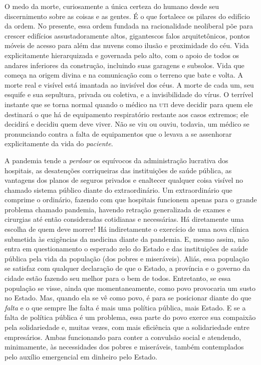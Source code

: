 O medo da morte, curiosamente a única certeza do humano desde seu
discernimento sobre as coisas e as gentes. É o que fortalece os pilares
do edifício da ordem. No presente, essa ordem fundada na racionalidade
neoliberal põe para crescer edifícios assustadoramente altos,
gigantescos falos arquitetônicos, pontos móveis de acesso para além das
nuvens como ilusão e proximidade do céu. Vida explicitamente
hierarquizada e governada pelo alto, com o apoio de todos os andares
inferiores da construção, incluindo suas garagens e subsolos. Vida que
começa na origem divina e na comunicação com o terreno que bate e volta.
A morte real e visível está imantada ao invisível dos céus. A morte de
cada um, seu esquife e sua sepultura, privada ou coletiva, e a
invisibilidade do vírus. O terrível instante que se torna normal quando
o médico na \textsc{uti} deve decidir para quem ele destinará o que há de
equipamento respiratório restante aos casos extremos; ele decidirá e
decidiu quem deve viver. Não se viu ou ouviu, todavia, um médico se
pronunciando contra a falta de equipamentos que o levava a se assenhorar
explicitamente da vida do \emph{paciente}.

A pandemia tende a \emph{perdoar} os equívocos da administração
lucrativa dos hospitais, as desatenções corriqueiras das instituições de
saúde pública, as vantagens dos planos de seguros privados e enaltecer
qualquer coisa visível no chamado sistema público diante do
extraordinário. Um extraordinário que comprime o ordinário, fazendo com
que hospitais funcionem apenas para o grande problema chamado pandemia,
havendo retração generalizada de exames e cirurgias até então
consideradas cotidianas e necessárias. Há diretamente uma escolha de
quem deve morrer! Há indiretamente o exercício de uma nova clínica
submetida às exigências da medicina diante da pandemia. E, mesmo assim,
não entra em questionamento o esperado zelo do Estado e das instituições
de saúde pública pela vida da população (dos pobres e miseráveis).
Aliás, essa população se satisfaz com qualquer declaração de que o
Estado, a província e o governo da cidade estão fazendo seu melhor para
o bem de todos. Entretanto, se essa população se visse, ainda que
momentaneamente, como povo provocaria um susto no Estado. Mas, quando
ela se vê como povo, é para se posicionar diante do que \emph{falta} e o
que sempre lhe falta é mais uma política pública, mais Estado. E se a
falta de política pública é um problema, essa parte do povo exerce sua
compaixão pela solidariedade e, muitas vezes, com mais eficiência que a
solidariedade entre empresários. Ambas funcionando para conter a
convulsão social e atendendo, minimamente, às necessidades dos pobres e
miseráveis, também contemplados pelo auxílio emergencial em dinheiro
pelo Estado.

